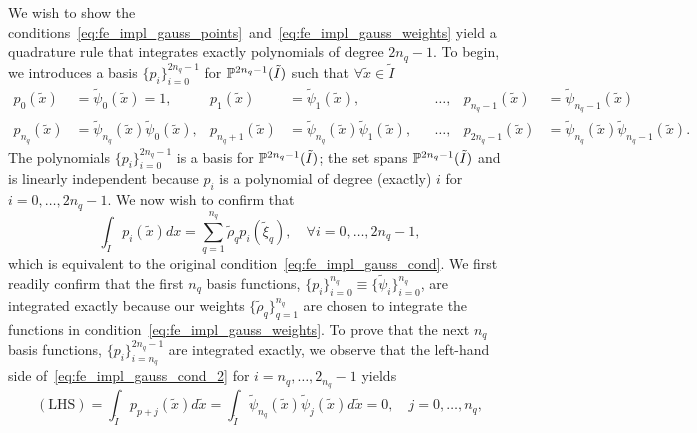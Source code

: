 We wish to show the conditions~\eqref{eq:fe_impl_gauss_points}~and~\eqref{eq:fe_impl_gauss_weights} yield a quadrature rule that integrates exactly polynomials of degree $2n_q-1$. To begin, we introduces a basis $\{p_i\}_{i=0}^{2n_q-1}$ for $\mathbb{P}^{2n_q-1}(\tilde I)$ such that $\forall \tilde x \in \tilde I$
\begin{align*}
  p_0(\tilde x) &= \tilde \psi_0(\tilde x) = 1, &
  p_1(\tilde x) &= \tilde \psi_1(\tilde x), &
  &\dots, &
  p_{n_q-1}(\tilde x) &= \tilde \psi_{n_q-1}(\tilde x) \\
  p_{n_q}(\tilde x) &= \tilde \psi_{n_q}(\tilde x) \tilde \psi_0(\tilde x), & 
  p_{n_q+1}(\tilde x) &= \tilde \psi_{n_q}(\tilde x) \tilde \psi_1(\tilde x), &  
  &\dots, &
  p_{2n_q-1}(\tilde x) &= \tilde \psi_{n_q}(\tilde x) \tilde \psi_{n_q-1}(\tilde x) .
\end{align*}
The polynomials $\{ p_i \}_{i=0}^{2n_q - 1}$ is a basis for $\mathbb{P}^{2n_q - 1}(\tilde I)$; the set spans $\mathbb{P}^{2n_q-1}(\tilde I)$ and is linearly independent because $p_i$ is a polynomial of degree (exactly) $i$ for $i = 0,\dots,2 n_q - 1$.
We now wish to confirm that
\begin{equation}
  \int_{\tilde I} p_i(\tilde x) dx = \sum_{q=1}^{n_q} \tilde \rho_q p_i(\tilde \xi_q), \quad \forall i = 0,\dots,2 n_q - 1,
  \label{eq:fe_impl_gauss_cond_2}
\end{equation}
which is equivalent to the original condition~\eqref{eq:fe_impl_gauss_cond}. We first readily confirm that the first $n_q$ basis functions, $\{p_i\}_{i=0}^{n_q} \equiv \{ \tilde \psi_i \}_{i=0}^{n_q}$, are integrated exactly because our weights $\{ \tilde \rho_q \}_{q=1}^{n_q}$ are chosen to integrate the functions in condition~\eqref{eq:fe_impl_gauss_weights}. 
To prove that the next $n_q$ basis functions, $\{ p_i \}_{i=n_q}^{2n_q-1}$ are integrated exactly, we observe that the left-hand side of~\ref{eq:fe_impl_gauss_cond_2} for $i = n_q,\dots,2_{n_q}-1$ yields 
\begin{equation*}
  (\text{LHS})
  = \int_{\tilde I} p_{p+j}(\tilde x) d \tilde x
  = \int_{\tilde I} \tilde \psi_{n_q}(\tilde x) \tilde \psi_{j}(\tilde x) d \tilde x
  = 0, \quad j = 0,\dots,n_q,
\end{equation*}

